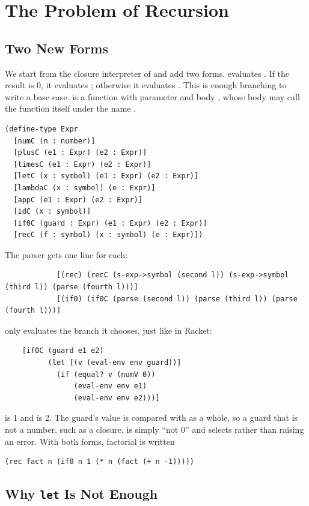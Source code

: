 \section{The Problem of Recursion}
\label{sec:recproblem}

\subsection{Two New Forms}

We start from the closure interpreter of  and add two forms.  evaluates . If the result is 0, it evaluates ; otherwise it evaluates . This is enough branching to write a base case.  is a function with parameter  and body , whose body may call the function itself under the name .
\begin{lstlisting}
(define-type Expr
  [numC (n : number)]
  [plusC (e1 : Expr) (e2 : Expr)]
  [timesC (e1 : Expr) (e2 : Expr)]
  [letC (x : symbol) (e1 : Expr) (e2 : Expr)]
  [lambdaC (x : symbol) (e : Expr)]
  [appC (e1 : Expr) (e2 : Expr)]
  [idC (x : symbol)]
  [if0C (guard : Expr) (e1 : Expr) (e2 : Expr)]
  [recC (f : symbol) (x : symbol) (e : Expr)])
\end{lstlisting}
The parser gets one line for each:
\begin{lstlisting}
            [(rec) (recC (s-exp->symbol (second l)) (s-exp->symbol (third l)) (parse (fourth l)))]
            [(if0) (if0C (parse (second l)) (parse (third l)) (parse (fourth l)))]
\end{lstlisting}
 only evaluates the branch it chooses, just like  in Racket:
\begin{lstlisting}
    [if0C (guard e1 e2)
          (let [(v (eval-env env guard))]
            (if (equal? v (numV 0))
                (eval-env env e1)
                (eval-env env e2)))]
\end{lstlisting}
 is 1 and  is 2. The guard's value is compared with  as a whole, so a guard that is not a number, such as a closure, is simply ``not 0'' and selects  rather than raising an error. With both forms, factorial is written
\begin{lstlisting}
(rec fact n (if0 n 1 (* n (fact (+ n -1)))))
\end{lstlisting}

\subsection{Why \texttt{let} Is Not Enough}

